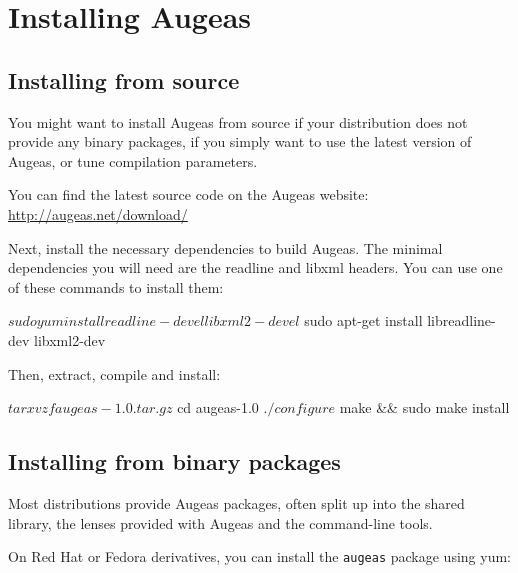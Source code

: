 \chapter{Installing Augeas}

\label{chap:installing_augeas} 

\section{Installing from source}

\label{sec:installing_from_source}

You might want to install Augeas from source if your distribution does not provide any binary packages, if you simply want to use the latest version of Augeas, or tune compilation parameters.

You can find the latest source code on the Augeas website:
\nopagebreak
	\url{http://augeas.net/download/}

Next, install the necessary dependencies to build Augeas. The minimal dependencies you will need are the readline and libxml headers. You can use one of these commands to install them:
\nopagebreak

\begin{console}[]
$ sudo yum install readline-devel libxml2-devel
$ sudo apt-get install libreadline-dev libxml2-dev
\end{console}

Then, extract, compile and install:
\nopagebreak

\begin{console}[]
$ tar xvzf augeas-1.0.tar.gz
$ cd augeas-1.0
$ ./configure
$ make && sudo make install
\end{console}



\section{Installing from binary packages}


\label{sec:installing_from_packages}

Most distributions provide Augeas packages, often split up into the shared library, the lenses provided with Augeas and the command-line tools.

On Red Hat or Fedora derivatives, you can install the \verb!augeas! package using yum:
\nopagebreak

